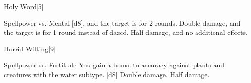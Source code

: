 \begin{spellsection}{Holy Word}[5]
    \begin{spellheader}
    \end{spellheader}
    \begin{spellcontent}
        \begin{spelltargetinginfo}
        \end{spelltargetinginfo}
        \begin{spelleffects}
            \begin{spellattack}{Spellpower vs. Mental}
                \spellsuccess {}[d8], and the target is \dazed for 2 rounds.
                \spellcritical Double damage, and the target is \stunned for 1 round instead of dazed.
                \spellfailure Half damage, and no additional effects.
            \end{spellattack}
        \end{spelleffects}
    \end{spellcontent}
    \begin{spellfooter}
        \miscastexplode
    \end{spellfooter}
\end{spellsection}

\begin{spellsection}{Horrid Wilting}[9]
    \begin{spellheader}
    \end{spellheader}
    \begin{spellcontent}
        \begin{spelltargetinginfo}
        \end{spelltargetinginfo}
        \begin{spelleffects}
            \begin{spellattack}{Spellpower vs. Fortitude}
                \spellspecial You gain a  bonus to accuracy against plants and creatures with the water subtype.
                \spellsuccess {}[d8]
                \spellcritical Double damage.
                \spellfailure Half damage.
            \end{spellattack}
        \end{spelleffects}
    \end{spellcontent}
    \begin{spellfooter}
        \miscastyou
    \end{spellfooter}
\end{spellsection}

